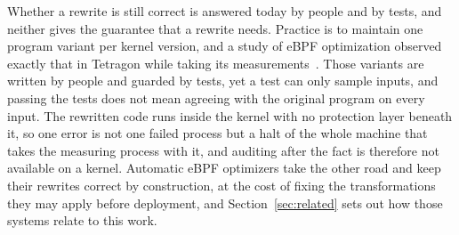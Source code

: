 Whether a rewrite is still correct is answered today by people and by tests, and neither gives the guarantee that a rewrite needs.
Practice is to maintain one program variant per kernel version, and a study of eBPF optimization observed exactly that in Tetragon while taking its measurements~\cite{mao2024merlin}.
Those variants are written by people and guarded by tests, yet a test can only sample inputs, and passing the tests does not mean agreeing with the original program on every input.
The rewritten code runs inside the kernel with no protection layer beneath it, so one error is not one failed process but a halt of the whole machine that takes the measuring process with it, and auditing after the fact is therefore not available on a kernel.
Automatic eBPF optimizers take the other road and keep their rewrites correct by construction, at the cost of fixing the transformations they may apply before deployment, and Section~\ref{sec:related} sets out how those systems relate to this work.
